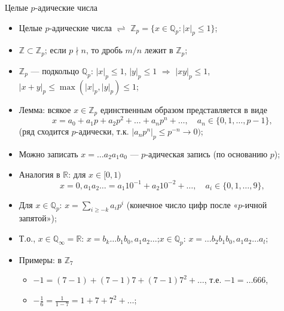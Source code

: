 \documentclass[serif, aspectratio=169]{beamer}
\begin{document}
\begin{frame}{Целые $p$-адические числа}
    \begin{itemize}
        \item Целые $p$-адические числа $\rightleftharpoons$ $\mathbb{Z}_p=\{x\in\mathbb{Q}_p : |x|_p\leqslant1\}$;
        \item $\mathbb{Z}\subset\mathbb{Z}_p$; если $p\nmid n$, то дробь $m/n$ лежит в $\mathbb{Z}_p$;
        \item $\mathbb{Z}_p$ --- подкольцо $\mathbb{Q}_p$: $|x|_p\leqslant1$, $|y|_p\leqslant1$ $\Rightarrow$ $|xy|_p\leqslant1$, $|x+y|_p\leqslant\max(|x|_p,|y|_p)\leqslant1$;
        \item Лемма: всякое $x\in\mathbb{Z}_p$ единственным образом представляется в виде
        \[x=a_0+a_1p+a_2p^2+\dots+a_n p^n+\dots,\quad a_n\in\{0,1,\dots,p-1\},\]
        (ряд сходится $p$-адически, т.к. $|a_np^n|_p\leqslant p^{-n}\to0)$; 
        \item Можно записать $x=\dots a_2a_1a_0$ --- $p$-адическая запись (по основанию $p$);
        \item Аналогия в $\mathbb{R}$: для $x\in[0,1)$ 
        \[x=0,a_1a_2 \dots =a_1 10^{-1}+a_2 10^{-2}+\dots,\quad a_i\in\{0,1,\dots,9\},\]
        \item Для $x\in\mathbb{Q}_p$: $x=\sum_{i\geqslant-k}a_ip^i$ (конечное число цифр после «$p$-ичной запятой»);
        \item Т.о., $x\in\mathbb{Q}_\infty=\mathbb{R}$: $x=b_k\dots b_1 b_0,a_1 a_2 \dots$;\quad $x\in\mathbb{Q}_p$: $x=\dots b_2 b_1 b_0,a_1 a_2 \dots a_l$;
        \item Примеры: в $\mathbb{Z}_7$
        \begin{itemize}
            \item $-1=(7-1)+(7-1)7+(7-1)7^2+\dots$, т.е. $-1=\dots666$,
            \item  $-\frac16=\frac{1}{1-7}=1+7+7^2+\dots$;
        \end{itemize}
    \end{itemize}
\end{frame}
\end{document}
